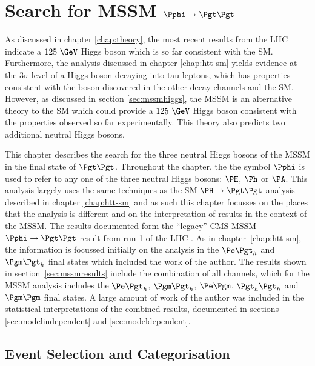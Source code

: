 \chapter{Search for \ac{MSSM} $\Pphi\to\Pgt\Pgt$}
\label{chap:htt-mssm}

As discussed in chapter \ref{chap:theory}, the most recent results from the
\ac{LHC} indicate a $125~\GeV$ Higgs boson which is so far consistent with the
\ac{SM}. Furthermore, the analysis discussed in chapter \ref{chap:htt-sm} yields 
evidence at the $3\sigma$ level of a Higgs boson decaying into tau leptons, which has 
properties consistent with the boson 
discovered in the other decay channels and the \ac{SM}.
However, as discussed in section \ref{sec:mssmhiggs}, the \ac{MSSM} is an
alternative theory to the \ac{SM} which could provide a $125~\GeV$ Higgs boson
consistent with the properties observed so far experimentally. This theory also
predicts two additional neutral Higgs bosons.

This chapter describes
the search for the three neutral Higgs bosons of the \ac{MSSM} in the final
state of $\Pgt\Pgt$. Throughout the chapter, the the symbol $\Pphi$ is used to refer to any one of the three
neutral Higgs bosons: $\PH$, $\Ph$ or $\PA$. This analysis largely uses the same
techniques as the \ac{SM} $\HToTauTau$ analysis described in chapter
\ref{chap:htt-sm} and as such this chapter focusses on the
places that the analysis is different and on the interpretation of results in
the context of the \ac{MSSM}. The results documented form the ``legacy''
CMS \ac{MSSM} $\Pphi\to\Pgt\Pgt$ result from run 1 of the \ac{LHC}
\cite{HIG-13-021}. As in chapter~\ref{chap:htt-sm}, the information is focussed
initially on the analysis in the $\etau$ and $\mutau$ final states which
included the work of the author. The results shown in
section~\ref{sec:mssmresults} include the combination of all channels, which for
the \ac{MSSM} analysis includes the $\etau$, $\mutau$, $\emu$, $\tautau$ and
$\mumu$ final states. A large amount of work of the author was included in
the statistical interpretations of the combined results, documented in sections
\ref{sec:modelindependent} and \ref{sec:modeldependent}. 

\section{Event Selection and Categorisation}
\label{sec:mssmEventSelection}

